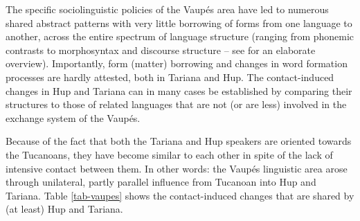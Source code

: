 \documentclass[output=paper,
modfonts
]{langscibook}
\begin{document}
\noindent The specific sociolinguistic policies of the Vaupés area have led to numerous shared abstract patterns with very little borrowing of forms from one language to another, across the entire spectrum of language structure (ranging from phonemic contrasts to morphosyntax and discourse structure -- see \textcite{Aikhenvald2002Language} for an elaborate overview). Importantly, form (matter) borrowing and changes in word formation processes are hardly attested, both in Tariana and Hup. The contact-induced changes in Hup and Tariana can in many cases be established by comparing their structures to those of related languages that are not (or are less) involved in the exchange system of the Vaupés.

Because of the fact that both the Tariana and Hup speakers are oriented towards the Tucanoans, they have become similar to each other in spite of the lack of intensive contact between them. In other words: the Vaupés linguistic area arose through unilateral, partly parallel influence from Tucanoan into Hup and Tariana. Table \ref{tab-vaupes} shows the contact-induced changes that are shared by (at least) Hup and Tariana.\\
\end{document}
